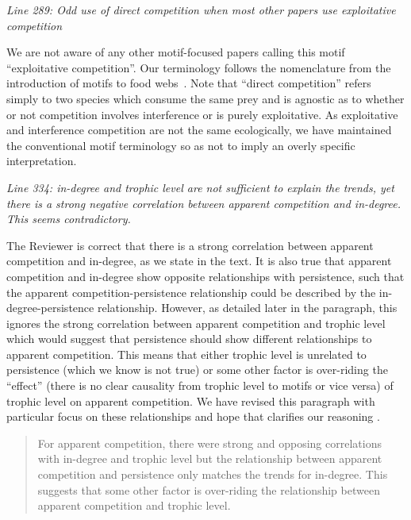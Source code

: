 \documentclass[12pt]{article}
\newcommand{\us}{\rm \setlength{\leftskip}{0.3cm} \setlength{\rightskip}{0.3cm}}
\newcommand{\them}{\it \setlength{\leftskip}{0cm} \setlength{\rightskip}{0cm}}
\begin{document}
        \them
        Line 289: Odd use of direct competition when most other papers use exploitative competition
        
        \us We are not aware of any other motif-focused papers calling this motif ``exploitative competition''. Our terminology follows the nomenclature from the introduction of motifs to food webs~\citep{Stouffer2007}.
        Note that ``direct competition'' refers simply to two species which consume the same prey and is agnostic as to whether or not competition involves interference or is purely exploitative. 
        As exploitative and interference competition are not the same ecologically, we have maintained the conventional motif terminology so as not to imply an overly specific interpretation.
        
        
        \them
        Line 334: in-degree and trophic level are not sufficient to explain the trends, yet there is a strong negative correlation between apparent competition and in-degree. This seems contradictory.
        
        \us The Reviewer is correct that there is a strong  correlation between apparent competition and in-degree, as we state in the text. It is also true that apparent competition and in-degree show opposite relationships with persistence, such that the apparent competition-persistence relationship could be described by the in-degree-persistence relationship. However, as detailed later in the paragraph, this ignores the strong correlation between apparent competition and trophic level which would suggest that persistence should show different relationships to apparent competition. This means that either trophic level is unrelated to persistence (which we know is not true) or some other factor is over-riding the ``effect'' (there is no clear causality from trophic level to motifs or vice versa) of trophic level on apparent competition.
        We have revised this paragraph with particular focus on these relationships and hope that clarifies our reasoning .
        
        
        \begin{quotation}
            For apparent competition, there were strong and opposing correlations with in-degree and trophic level but the relationship between apparent competition and persistence only matches the trends for in-degree.
            This suggests that some other factor is over-riding the relationship between apparent competition and trophic level.        
        \end{quotation}
        
\end{document}
